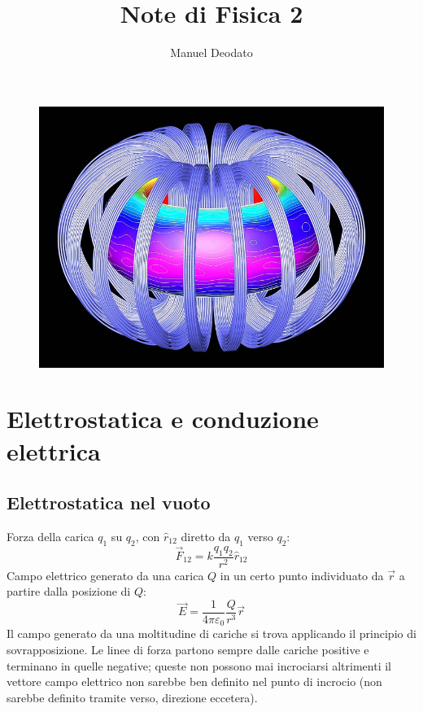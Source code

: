 \documentclass[a4paper]{scrartcl}
\title{Note di Fisica 2}
\author{Manuel Deodato}
\date{}
\renewcommand{\maketitle}{
\begin{center}
{\sffamily
{\fontsize{20}{20}\selectfont\MakeUppercase\thetitle}}

\vspace{0.2in}

{\large\scshape\sffamily\theauthor}
\end{center}
}
\numberwithin{equation}{subsection}
\theoremstyle{style1}
\begin{document}
\maketitle
\vspace{9cm}
\begin{figure}[h!]
	\centering
	\includegraphics[width=1\columnwidth]{front.jpg}
\end{figure}
\newpage
\tableofcontents 
\newpage
\section{Elettrostatica e conduzione elettrica}
\subsection{Elettrostatica nel vuoto}


Forza della carica $q_1$ su $q_2$, con $\hat{r}_{12}$ diretto da $q_1$ verso $q_2$:
\begin{equation}
	\vec{F}_{12}  = k \frac{q_1q_2}{r^2}\hat{r}_{12} 
\end{equation}
Campo elettrico generato da una carica $Q$ in un certo punto individuato da $\vec{r}$ a partire dalla posizione di $Q$:
\begin{equation}
	\vec{E} = \frac{1}{4\pi \varepsilon_0} \frac{Q}{r^3}\vec{r}
\end{equation}
Il campo generato da una moltitudine di cariche si trova applicando il principio di sovrapposizione. Le linee di forza partono sempre dalle cariche positive e terminano in quelle negative; queste non possono mai incrociarsi altrimenti il vettore campo elettrico non sarebbe ben definito nel punto di incrocio (non sarebbe definito tramite verso, direzione eccetera).
\end{document}
